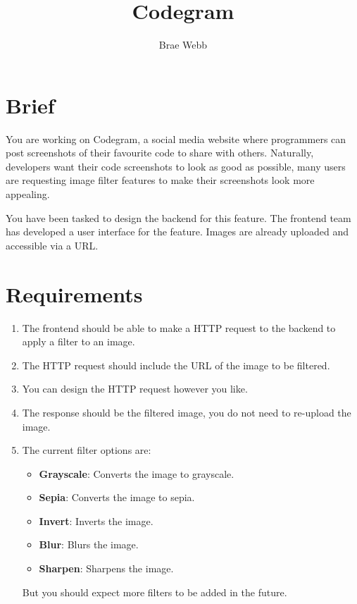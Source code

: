 \documentclass{csse4400}
\title{Codegram}
\author{Brae Webb}
\date{\week{2}}
\begin{document}
\maketitle

\section{Brief}

You are working on Codegram,
a social media website where programmers can post screenshots of their favourite code to share with others.
Naturally, developers want their code screenshots to look as good as possible,
many users are requesting image filter features to make their screenshots look more appealing.

You have been tasked to design the backend for this feature.
The frontend team has developed a user interface for the feature.
Images are already uploaded and accessible via a URL.

\section{Requirements}

\begin{enumerate}
    \item The frontend should be able to make a HTTP request to the backend to apply a filter to an image.
    \item The HTTP request should include the URL of the image to be filtered.
    \item You can design the HTTP request however you like.
    \item The response should be the filtered image, you do not need to re-upload the image.
    \item The current filter options are:
    \begin{itemize}
        \item \textbf{Grayscale}: Converts the image to grayscale.
        \item \textbf{Sepia}: Converts the image to sepia.
        \item \textbf{Invert}: Inverts the image.
        \item \textbf{Blur}: Blurs the image.
        \item \textbf{Sharpen}: Sharpens the image.
    \end{itemize}
        But you should expect more filters to be added in the future.
\end{enumerate}
\end{document}
